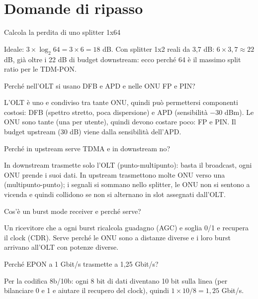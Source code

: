 \section{Domande di ripasso}

\begin{approfondimento}{Calcola la perdita di uno splitter 1x64}

Ideale: \(3 \times \log_2 64 = 3 \times 6 = 18\) dB. Con splitter 1x2 reali da 3,7 dB: \(6 \times 3{,}7 \approx 22\) dB, già oltre i 22 dB di budget downstream: ecco perché 64 è il massimo split ratio per le TDM-PON.

\end{approfondimento}

\begin{approfondimento}{Perché nell'OLT si usano DFB e APD e nelle ONU FP e PIN?}

L'OLT è uno e condiviso tra tante ONU, quindi può permettersi componenti costosi: DFB (spettro stretto, poca dispersione) e APD (sensibilità −30 dBm). Le ONU sono tante (una per utente), quindi devono costare poco: FP e PIN. Il budget upstream (30 dB) viene dalla sensibilità dell'APD.

\end{approfondimento}

\begin{approfondimento}{Perché in upstream serve TDMA e in downstream no?}

In downstream trasmette solo l'OLT (punto-multipunto): basta il broadcast, ogni ONU prende i suoi dati. In upstream trasmettono molte ONU verso una (multipunto-punto); i segnali si sommano nello splitter, le ONU non si sentono a vicenda e quindi collidono se non si alternano in slot assegnati dall'OLT.

\end{approfondimento}

\begin{approfondimento}{Cos'è un burst mode receiver e perché serve?}

Un ricevitore che a ogni burst ricalcola guadagno (AGC) e soglia 0/1 e recupera il clock (CDR). Serve perché le ONU sono a distanze diverse e i loro burst arrivano all'OLT con potenze diverse.

\end{approfondimento}

\begin{approfondimento}{Perché EPON a 1 Gbit/s trasmette a 1,25 Gbit/s?}

Per la codifica 8b/10b: ogni 8 bit di dati diventano 10 bit sulla linea (per bilanciare 0 e 1 e aiutare il recupero del clock), quindi \(1 \times 10/8 = 1{,}25\) Gbit/s.

\end{approfondimento}

